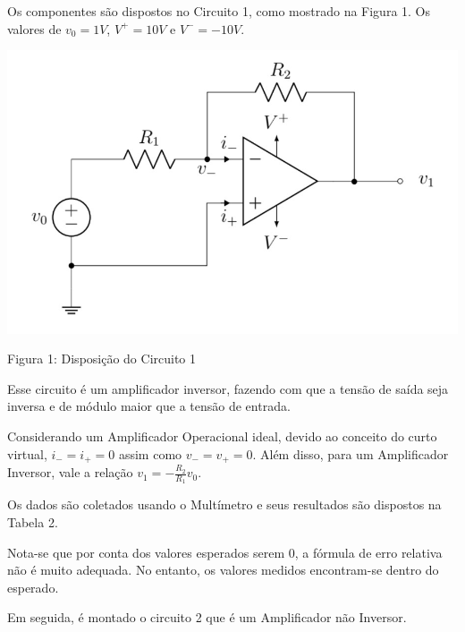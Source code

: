 \documentclass[a4 paper]{article}
\begin{document}


Os componentes são dispostos no Circuito 1, como mostrado na Figura 1. Os valores de $v_0 =1V$, $V^+=10V$ e $V^-=-10V$.

\begin{table}[h]
\centering
\includegraphics[scale=0.4]{figuras/circuito1}
\end{table}
\begin{center}
Figura 1: Disposição do Circuito 1
\end{center}

Esse circuito é um amplificador inversor, fazendo com que a tensão de saída seja inversa e de módulo maior que a tensão de entrada. 

Considerando um Amplificador Operacional ideal, devido ao conceito do curto virtual, $i_-=i_+=0$ assim como $v_-=v_+ =0$. Além disso, para um Amplificador Inversor, vale a relação $v_1=-\frac{R_2}{R_1}v_0$.

Os dados são coletados usando o Multímetro e seus resultados são dispostos na Tabela 2.



Nota-se que por conta dos valores esperados serem 0, a fórmula de erro relativa não é muito adequada. No entanto, os valores medidos encontram-se dentro do esperado.

\newpage
Em seguida, é montado o circuito 2 que é um Amplificador não Inversor.
\end{document}
